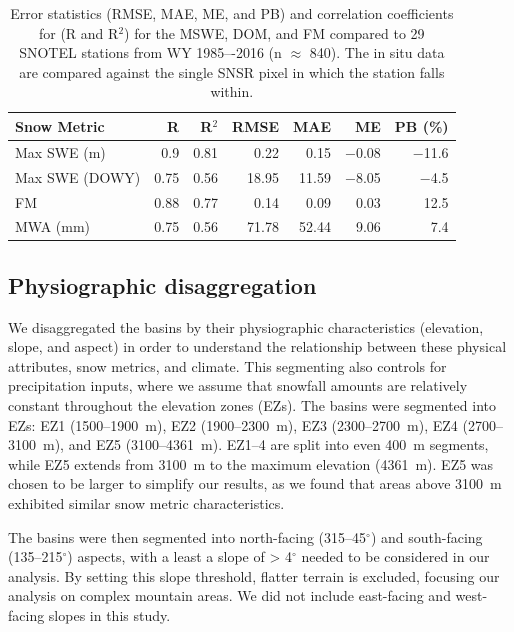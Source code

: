 \begin{table}[htbp]
  \centering
  \caption{Error statistics (RMSE, MAE, ME, and PB) and correlation coefficients for (R and R$^{2}$) for the MSWE, DOM, and FM compared to 29 SNOTEL stations from WY 1985–-2016 (n $\approx$ 840). The in situ data are compared against the single SNSR pixel in which the station falls within.}
  \label{tab:snow_metrics_val_table}
  \begin{tabular}{lrrrrrr}
    \toprule
    Snow Metric & R & R$^{2}$ & RMSE & MAE & ME & PB (\%) \\
    \midrule
    Max SWE (m) & 0.9 & 0.81 & 0.22 & 0.15 & $-$0.08 & $-$11.6 \\
    Max SWE (DOWY) & 0.75 & 0.56 & 18.95 & 11.59 & $-$8.05 & $-$4.5 \\
    FM & 0.88 & 0.77 & 0.14 & 0.09 & 0.03 & 12.5 \\
    MWA (mm) & 0.75 & 0.56 & 71.78 & 52.44 & 9.06 & 7.4 \\
    \bottomrule
  \end{tabular}
\end{table}

\hypertarget{ch2-methods-2}{\subsection{Physiographic disaggregation}\label{ch2-methods-2}}

We disaggregated the basins by their physiographic characteristics (elevation, slope, and aspect) in order to understand the relationship between these physical attributes, snow metrics, and climate. This segmenting also controls for precipitation inputs, where we assume that snowfall amounts are relatively constant throughout the elevation zones (EZs). The basins were segmented into EZs: EZ1 (1500--1900~m), EZ2 (1900--2300~m), EZ3 (2300--2700~m), EZ4 (2700--3100~m), and EZ5 (3100--4361~m). EZ1--4 are split into even 400~m segments, while EZ5 extends from 3100~m to the maximum elevation (4361~m). EZ5 was chosen to be larger to simplify our results, as we found that areas above 3100~m exhibited similar snow metric characteristics. 

The basins were then segmented into north-facing (315--45$^{\circ}$) and south-facing (135--215$^{\circ}$) aspects, with a least a slope of > 4$^{\circ}$ needed to be considered in our analysis. By setting this slope threshold, flatter terrain is excluded, focusing our analysis on complex mountain areas. We did not include east-facing and west-facing slopes in this study. 

